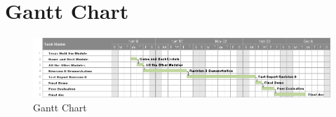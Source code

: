 \documentclass[11pt]{article}
\begin{document}
 
    \section{Gantt Chart}
		\begin{figure}[h]
		\includegraphics[scale=0.4]{Gantt.png}
		\caption{Gantt Chart}
		\label{fig1: Figure1}
		\end{figure}
        
    
\end{document}
